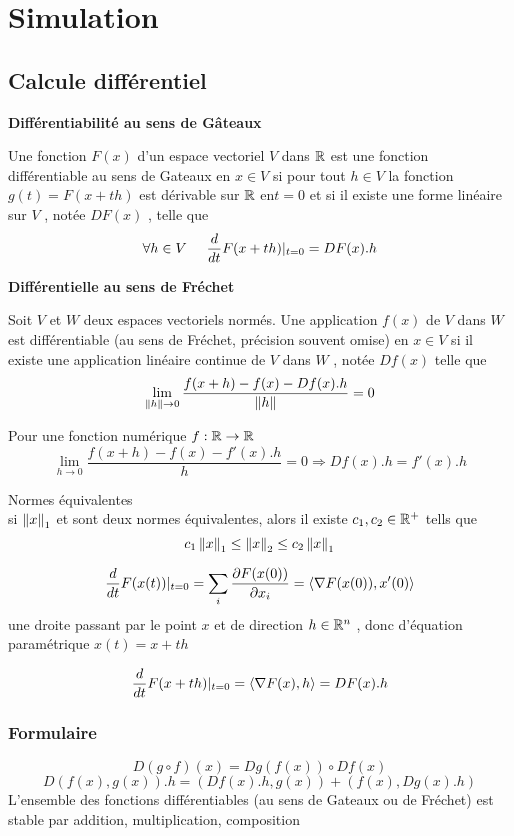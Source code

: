 \chapter{Simulation}
\section{Calcule diff\'erentiel}
\textbf{Diff\'erentiabilit\'e au sens de G\^ateaux}
\begin{definition}
Une fonction $F(x)$ d'un espace vectoriel $ V$  dans $\mathbb{R}$ est
une fonction diff\'erentiable au sens de Gateaux en $ x\in V$  si pour tout $ h \in V$  la fonction $ g(t) = F(x+th)$  est d\'erivable sur $\mathbb{R}$ en$
t = 0 $ et si il existe une forme lin\'eaire sur $ V$  , not\'ee $ DF(x)$ , telle que
$$
\forall h \in V \hspace{0.5cm} \frac{d}{d t}F(x+th)|_{t = 0} = DF(x).h
$$
\end{definition}

\textbf{Diff\'erentielle au sens de Fr\'echet}
\begin{definition}
		Soit $V$ et $W$ deux espaces vectoriels norm\'es.
Une application $ f(x)$ de $V$  dans $W$  est diff\'erentiable (au sens de Fr\'echet, pr\'ecision souvent omise) en $x \in V$  si il existe
une application lin\'eaire continue de $V$ dans $W$ , not\'ee $Df(x)$ telle que
$$
\lim_{\left\Vert h\right\Vert\to 0}  \frac{ f(x+h) - f(x) - Df(x).h}{\left\Vert h\right\Vert} = 0
$$
\end{definition}
Pour une fonction num\'erique $f:\mathbb{R} \to \mathbb{R}$
$$
\lim_{h \to 0} \frac{ f(x+h) - f(x) - f'(x).h}{h} = 0 \Rightarrow
Df(x).h = f'(x).h
$$

Normes \'equivalentes \\
si 
$\left\Vert x\right\Vert_1$
et 
sont deux normes \'equivalentes, alors il existe $c_1,c_2 \in \mathbb{R}^+$ tells que
$$
c_1 \left\Vert x\right\Vert_1 \leq \left\Vert x\right\Vert_2 \leq c_2 \left\Vert x\right\Vert_1
$$

$$
\frac{d}{dt}F(x(t))|_{t = 0} 
= \sum_i \frac{\partial F(x(0))}{\partial x_i}
= \langle \nabla F(x(0)) , x'(0)\rangle
$$
une droite passant par le point $x$ et de direction $ h \in \mathbb{R}^n$ , donc d'\'equation param\'etrique $ x(t) = x + th$ 

$$
\frac{d}{dt}F(x+th)|_{t = 0} 
= \langle \nabla F(x) , h\rangle
= DF(x).h
$$

\subsection{Formulaire}
$$ D(g\circ f)(x) = Dg(f(x)) \circ Df(x) $$
$$ D(f(x),g(x)).h = (Df(x).h, g(x)) + (f(x), Dg(x).h)$$
L'ensemble des fonctions diff\'erentiables (au sens de Gateaux ou de Fr\'echet) est stable par addition, multiplication, composition


